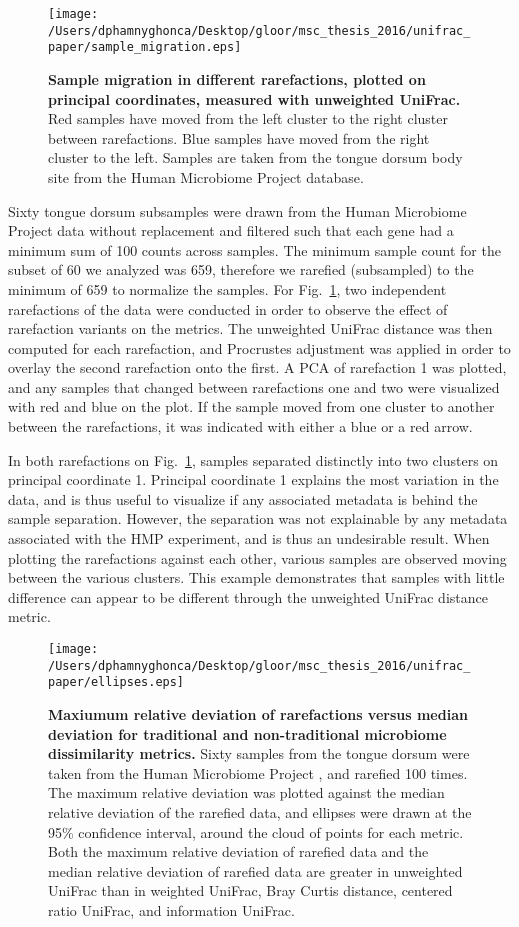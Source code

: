 \documentclass[10pt,letterpaper]{article}
\begin{document}
\begin{figure}[h]
\texttt{[image: /Users/dphamnyghonca/Desktop/gloor/msc\_thesis\_2016/unifrac\_paper/sample\_migration.eps]}
\caption{{\bf Sample migration in different rarefactions, plotted on principal coordinates, measured with unweighted UniFrac.}
Red samples have moved from the left cluster to the right cluster between rarefactions. Blue samples have moved from the right cluster to the left. Samples are taken from the tongue dorsum body site from the Human Microbiome Project database.}
\label{fig2}
\end{figure}

Sixty tongue dorsum subsamples were drawn from the Human Microbiome Project data without replacement and filtered such that each gene had a minimum sum of 100 counts across samples. The minimum sample count for the subset of 60 we analyzed was 659, therefore we rarefied (subsampled) to the minimum of 659 to normalize the samples. For Fig.~\ref{fig2}, two independent rarefactions of the data were conducted in order to observe the effect of rarefaction variants on the metrics. The unweighted UniFrac distance was then computed for each rarefaction, and Procrustes adjustment was applied in order to overlay the second rarefaction onto the first. A PCA of rarefaction 1 was plotted, and any samples that changed between rarefactions one and two were visualized with red and blue on the plot. If the sample moved from one cluster to another between the rarefactions, it was indicated with either a blue or a red arrow. 

In both rarefactions on Fig.~\ref{fig2}, samples separated distinctly into two clusters on principal coordinate 1. Principal coordinate 1 explains the most variation in the data, and is thus useful to visualize if any associated metadata is behind the sample separation. However, the separation was not explainable by any metadata associated with the HMP experiment, and is thus an undesirable result. When plotting the rarefactions against each other, various samples are observed moving between the various clusters. This example demonstrates that samples with little difference can appear to be different through the unweighted UniFrac distance metric.

\begin{figure}[h]
\texttt{[image: /Users/dphamnyghonca/Desktop/gloor/msc\_thesis\_2016/unifrac\_paper/ellipses.eps]}
\caption{{\bf Maxiumum relative deviation of rarefactions versus median deviation for traditional and non-traditional microbiome dissimilarity metrics.} Sixty samples from the tongue dorsum were taken from the Human Microbiome Project \cite{turnbaugh2007human}, and rarefied 100 times. The maximum relative deviation was plotted against the median relative deviation of the rarefied data, and ellipses were drawn at the 95\% confidence interval, around the cloud of points for each metric. Both the maximum relative deviation of rarefied data and the median relative deviation of rarefied data are greater in unweighted UniFrac than in weighted UniFrac, Bray Curtis distance, centered ratio UniFrac, and information UniFrac.}
\label{fig3}
\end{figure}
\end{document}
